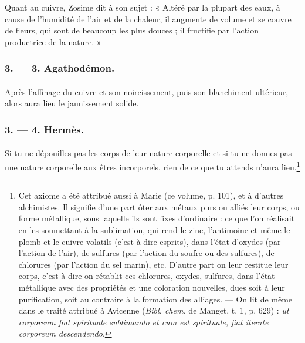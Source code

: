 \documentclass[a4paper, 11pt, oneside, polutonikogreek, french]{article}
\begin{document}
Quant au cuivre, Zosime dit à son sujet : « Altéré par la plupart des eaux, à cause de l'humidité de l'air et de la chaleur, il augmente de volume et se couvre de fleurs, qui sont de beaucoup les plus douces ; il fructifie par l'action productrice de la nature. »

\bigskip
\centerline{\EightStarTaper}
\centerline{\EightStarTaper\EightStarTaper}
\bigskip

\subsubsection{3. --- 3. Agathodémon.}
\paragraph{}
Après l'affinage du cuivre et son noircissement, puis son blanchiment ultérieur, alors aura lieu le jaunissement solide.

\bigskip
\centerline{\EightStarTaper}
\centerline{\EightStarTaper\EightStarTaper}
\bigskip

\subsubsection{3. --- 4. Hermès.}
\paragraph{}
Si tu ne dépouilles pas les corps de leur nature corporelle et si tu ne donnes pas une nature corporelle aux êtres incorporels, rien de ce que tu attends n'aura lieu.\footnote{Cet axiome a été attribué aussi à Marie (ce volume, p. 101), et à d'autres alchimistes. Il signifie d'une part ôter aux métaux purs ou alliés leur corps, ou forme métallique, sous laquelle ils sont fixes d'ordinaire : ce que l'on réalisait en les soumettant à la sublimation, qui rend le zinc, l'antimoine et même le plomb et le cuivre volatils (c'est à-dire esprits), dans l'état d'oxydes (par l'action de l'air), de sulfures (par l'action du soufre ou des sulfures), de chlorures (par l'action du sel marin), etc. D'autre part on leur restitue leur corps, c'est-à-dire on rétablit ces chlorures, oxydes, sulfures, dans l'état métallique avec des propriétés et une coloration nouvelles, dues soit à leur purification, soit au contraire à la formation des alliages. --- On lit de même dans le traité attribué à Avicenne (\emph{Bibl. chem.} de Manget, t. 1, p. 629) : \emph{ut corporeum fiat spirituale sublimando et cum est spirituale, fiat iterate corporeum descendendo}.}
\end{document}
